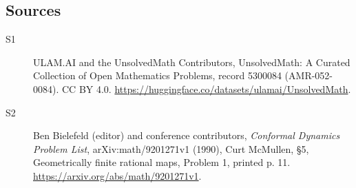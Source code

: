 \documentclass[11pt]{article}
\begin{document}
\subsection{Sources}
\begin{description}
\item[\hypertarget{source:5300084:1}{S1}] ULAM.AI and the UnsolvedMath Contributors, UnsolvedMath: A Curated Collection of Open Mathematics Problems, record 5300084 (AMR-052-0084). CC BY 4.0. \url{https://huggingface.co/datasets/ulamai/UnsolvedMath}.
\item[\hypertarget{source:5300084:2}{S2}] Ben Bielefeld (editor) and conference contributors, \emph{Conformal Dynamics Problem List}, arXiv:math/9201271v1 (1990), Curt McMullen, \S5, Geometrically finite rational maps, Problem 1, printed p. 11. \url{https://arxiv.org/abs/math/9201271v1}.
\end{description}
\label{end:5300084}
\end{document}

